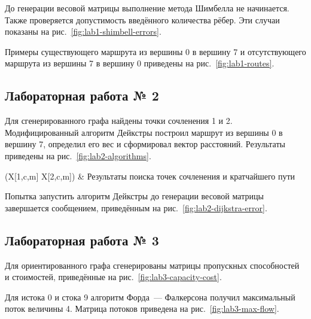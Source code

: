 До генерации весовой матрицы выполнение метода Шимбелла не начинается. Также проверяется допустимость введённого количества рёбер. Эти случаи показаны на рис.~\ref{fig:lab1-shimbell-errors}.


Примеры существующего маршрута из вершины 0 в вершину 7 и отсутствующего маршрута из вершины 7 в вершину 0 приведены на рис.~\ref{fig:lab1-routes}.


\subsection{Лабораторная работа № 2}

Для сгенерированного графа найдены точки сочленения 1 и 2. Модифицированный алгоритм Дейкстры построил маршрут из вершины 0 в вершину 7, определил его вес и сформировал вектор расстояний. Результаты приведены на рис.~\ref{fig:lab2-algorithms}.

\imgGrid[1ex](X[1,c,m] X[2,c,m]){
     &
}{Результаты поиска точек сочленения и кратчайшего пути}{\label{fig:lab2-algorithms}}

Попытка запустить алгоритм Дейкстры до генерации весовой матрицы завершается сообщением, приведённым на рис.~\ref{fig:lab2-dijkstra-error}.


\subsection{Лабораторная работа № 3}

Для ориентированного графа сгенерированы матрицы пропускных способностей и стоимостей, приведённые на рис.~\ref{fig:lab3-capacity-cost}.


Для истока 0 и стока 9 алгоритм Форда~--- Фалкерсона получил максимальный поток величины 4. Матрица потоков приведена на рис.~\ref{fig:lab3-max-flow}.

